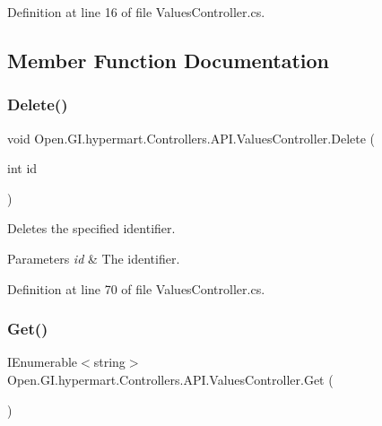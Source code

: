 Definition at line 16 of file Values\+Controller.\+cs.



\subsection{Member Function Documentation}
\mbox{\label{class_open_1_1_g_i_1_1hypermart_1_1_controllers_1_1_a_p_i_1_1_values_controller_aac5ef946899bcf7c07bdf860004f8c1a}} 
\subsubsection{Delete()}
{\footnotesize\ttfamily void Open.\+G\+I.\+hypermart.\+Controllers.\+A\+P\+I.\+Values\+Controller.\+Delete (\begin{DoxyParamCaption}\item[{int}]{id }\end{DoxyParamCaption})}



Deletes the specified identifier. 


\begin{DoxyParams}{Parameters}
{\em id} & The identifier.\\
\hline
\end{DoxyParams}


Definition at line 70 of file Values\+Controller.\+cs.

\mbox{\label{class_open_1_1_g_i_1_1hypermart_1_1_controllers_1_1_a_p_i_1_1_values_controller_a22701a876d9570628f81c46396db9470}} 
\subsubsection{Get()\hspace{0.1cm}{\footnotesize\ttfamily [1/2]}}
{\footnotesize\ttfamily I\+Enumerable$<$string$>$ Open.\+G\+I.\+hypermart.\+Controllers.\+A\+P\+I.\+Values\+Controller.\+Get (\begin{DoxyParamCaption}{ }\end{DoxyParamCaption})}




